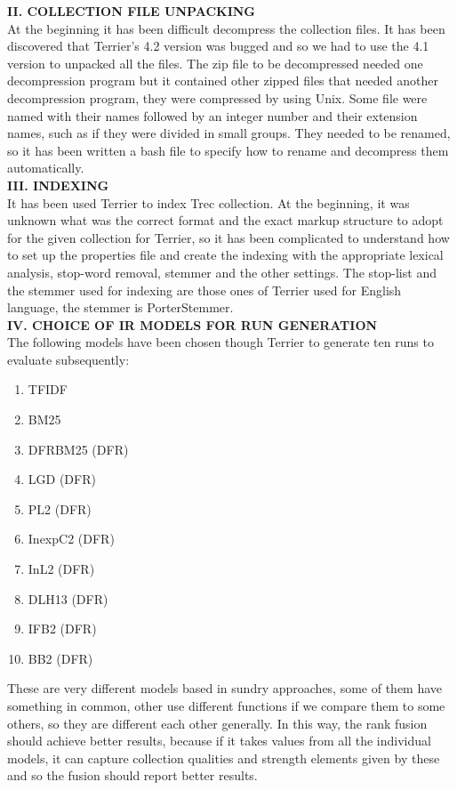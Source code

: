 \documentclass[12pt,journal]{IEEEtran}
\begin{document}
\textbf{II.	COLLECTION FILE UNPACKING} \\
At the beginning it has been difficult decompress the collection files. It has been discovered that Terrier’s 4.2 version was bugged and so we had to use the 4.1 version to unpacked all the files.
The zip file to be decompressed needed one decompression program but it contained other zipped files that needed another decompression program, they were compressed by using Unix. Some file were named with their names followed by an integer number and their extension names, such as if they were divided in small groups. They needed to be renamed, so it has been written a bash file to specify how to rename and decompress them automatically. \\

\textbf{III. INDEXING} \\
It has been used Terrier to index Trec collection. 
At the beginning, it was unknown what was the correct format and the exact markup structure to adopt for the given collection for Terrier, so it has been complicated to understand how to set up the properties file and create the indexing with the appropriate lexical analysis, stop-word removal, stemmer and the other settings. The stop-list and the stemmer used for indexing are those ones of Terrier used for English language, the stemmer is PorterStemmer. \\

\textbf{IV. CHOICE OF IR MODELS FOR RUN GENERATION} \\
The following models have been chosen though Terrier to generate ten runs to evaluate subsequently: 
\begin{enumerate}
\item TFIDF
\item BM25
\item DFRBM25 (DFR)
\item LGD (DFR)
\item PL2 (DFR)
\item InexpC2 (DFR)
\item InL2 (DFR)
\item DLH13 (DFR)
\item IFB2 (DFR)
\item BB2 (DFR)
\end{enumerate} 
These are very different models based in sundry approaches, some of them have something in common, other use different functions if we compare them to some others, so they are different each other generally. In this way, the rank fusion should achieve better results, because if it takes values from all the individual models, it can capture collection qualities and strength elements given by these and so the fusion should report better results. \\
\end{document}
